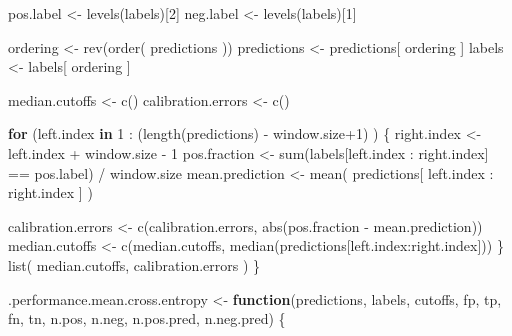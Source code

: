 \documentclass[
  letterpaper,
  DIV=11,
  numbers=noendperiod]{scrartcl}
\newenvironment{Shaded}{\begin{snugshade}}{\end{snugshade}}
\newcommand{\ControlFlowTok}[1]{\textcolor[rgb]{0.00,0.23,0.31}{\textbf{#1}}}
\newcommand{\DecValTok}[1]{\textcolor[rgb]{0.68,0.00,0.00}{#1}}
\newcommand{\FunctionTok}[1]{\textcolor[rgb]{0.28,0.35,0.67}{#1}}
\newcommand{\NormalTok}[1]{\textcolor[rgb]{0.00,0.23,0.31}{#1}}
\newcommand{\OtherTok}[1]{\textcolor[rgb]{0.00,0.23,0.31}{#1}}
\newcommand{\SpecialCharTok}[1]{\textcolor[rgb]{0.37,0.37,0.37}{#1}}
\begin{document}
\begin{Shaded}
\begin{Highlighting}[]
\NormalTok{      pos.label }\OtherTok{\textless{}{-}} \FunctionTok{levels}\NormalTok{(labels)[}\DecValTok{2}\NormalTok{]}
\NormalTok{      neg.label }\OtherTok{\textless{}{-}} \FunctionTok{levels}\NormalTok{(labels)[}\DecValTok{1}\NormalTok{]}

\NormalTok{      ordering }\OtherTok{\textless{}{-}} \FunctionTok{rev}\NormalTok{(}\FunctionTok{order}\NormalTok{( predictions ))}
\NormalTok{      predictions }\OtherTok{\textless{}{-}}\NormalTok{ predictions[ ordering ]}
\NormalTok{      labels }\OtherTok{\textless{}{-}}\NormalTok{ labels[ ordering ]}

\NormalTok{      median.cutoffs }\OtherTok{\textless{}{-}} \FunctionTok{c}\NormalTok{()}
\NormalTok{      calibration.errors }\OtherTok{\textless{}{-}} \FunctionTok{c}\NormalTok{()}

      \ControlFlowTok{for}\NormalTok{ (left.index }\ControlFlowTok{in} \DecValTok{1} \SpecialCharTok{:}\NormalTok{ (}\FunctionTok{length}\NormalTok{(predictions) }\SpecialCharTok{{-}}\NormalTok{ window.size}\SpecialCharTok{+}\DecValTok{1}\NormalTok{) ) \{}
\NormalTok{          right.index }\OtherTok{\textless{}{-}}\NormalTok{ left.index }\SpecialCharTok{+}\NormalTok{ window.size }\SpecialCharTok{{-}} \DecValTok{1}
\NormalTok{          pos.fraction }\OtherTok{\textless{}{-}}
            \FunctionTok{sum}\NormalTok{(labels[left.index }\SpecialCharTok{:}\NormalTok{ right.index] }\SpecialCharTok{==}\NormalTok{ pos.label) }\SpecialCharTok{/}\NormalTok{ window.size}
\NormalTok{          mean.prediction }\OtherTok{\textless{}{-}} \FunctionTok{mean}\NormalTok{( predictions[ left.index }\SpecialCharTok{:}\NormalTok{ right.index ] )}

\NormalTok{          calibration.errors }\OtherTok{\textless{}{-}} \FunctionTok{c}\NormalTok{(calibration.errors,}
                                  \FunctionTok{abs}\NormalTok{(pos.fraction }\SpecialCharTok{{-}}\NormalTok{ mean.prediction))}
\NormalTok{          median.cutoffs }\OtherTok{\textless{}{-}} \FunctionTok{c}\NormalTok{(median.cutoffs,}
                              \FunctionTok{median}\NormalTok{(predictions[left.index}\SpecialCharTok{:}\NormalTok{right.index]))}
\NormalTok{      \}}
      \FunctionTok{list}\NormalTok{( median.cutoffs, calibration.errors )}
\NormalTok{  \}}


\NormalTok{.performance.mean.cross.entropy }\OtherTok{\textless{}{-}}
  \ControlFlowTok{function}\NormalTok{(predictions, labels, cutoffs, fp, tp, fn, tn,}
\NormalTok{           n.pos, n.neg, n.pos.pred, n.neg.pred) \{}


\end{Highlighting}
\end{Shaded}
\end{document}
